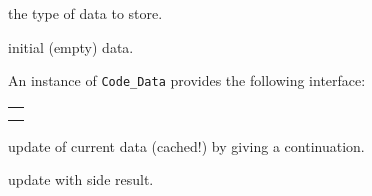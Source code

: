 \begin{isabellebody}
\begin{isamarkuptext}
  \begin{description}

  \item {} the type of data to store.

  \item {} initial (empty) data.

  \end{description}

  \noindent An instance of \verb|Code_Data| provides the following
  interface:

  \medskip
  \begin{tabular}{l}
  \isa{change{\isacharcolon}\ theory\ {\isasymrightarrow}\ {\isacharparenleft}T\ {\isasymrightarrow}\ T{\isacharparenright}\ {\isasymrightarrow}\ T} \\
  \isa{change{\isacharunderscore}yield{\isacharcolon}\ theory\ {\isasymrightarrow}\ {\isacharparenleft}T\ {\isasymrightarrow}\ {\isacharprime}a\ {\isacharasterisk}\ T{\isacharparenright}\ {\isasymrightarrow}\ {\isacharprime}a\ {\isacharasterisk}\ T}
  \end{tabular}

  \begin{description}

  \item {} update of current data (cached!)
    by giving a continuation.

  \item {} update with side result.

  \end{description}%
\end{isamarkuptext}%
\isamarkuptrue%
%
\isadelimtheory
%
\endisadelimtheory
%
\isatagtheory
{}\isamarkupfalse%
%
\endisatagtheory
{\isafoldtheory}%
%
\isadelimtheory
%
\endisadelimtheory
\isanewline
\end{isabellebody}%
